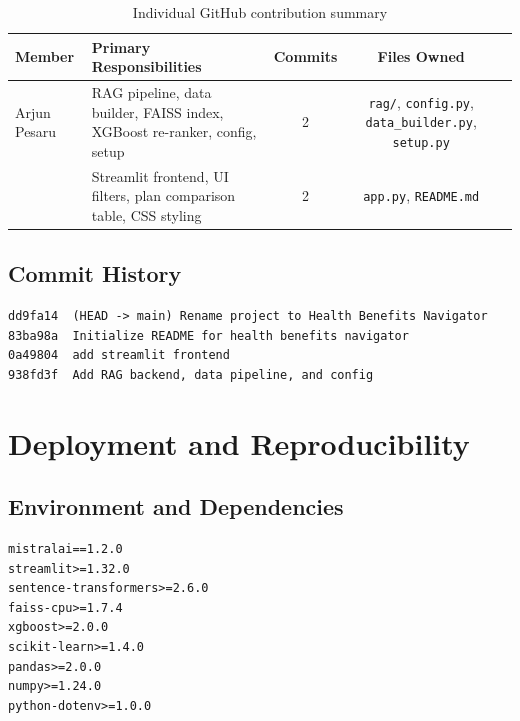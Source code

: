 \documentclass[12pt, letterpaper]{article}
\begin{document}
\begin{table}[H]
  \centering
  \caption{Individual GitHub contribution summary}
  \label{tab:git_contributions}
  \begin{tabularx}{\linewidth}{lXccc}
    \toprule
    \textbf{Member} & \textbf{Primary Responsibilities} & \textbf{Commits} & \textbf{Files Owned} \\
    \midrule
    Arjun Pesaru     & RAG pipeline, data builder, FAISS index, XGBoost re-ranker, config, setup & 2 & \texttt{rag/}, \texttt{config.py}, \texttt{data\_builder.py}, \texttt{setup.py} \\
    [Teammate Name]  & Streamlit frontend, UI filters, plan comparison table, CSS styling & 2 & \texttt{app.py}, \texttt{README.md} \\
    \bottomrule
  \end{tabularx}
\end{table}

\subsection{Commit History}

\begin{lstlisting}[style=gitlog, caption={Full commit log (git log --oneline) as of submission date}, label=lst:gitlog]
dd9fa14  (HEAD -> main) Rename project to Health Benefits Navigator
83ba98a  Initialize README for health benefits navigator
0a49804  add streamlit frontend
938fd3f  Add RAG backend, data pipeline, and config
\end{lstlisting}

\section{Deployment and Reproducibility}
\label{sec:deployment}

\subsection{Environment and Dependencies}

\begin{lstlisting}[caption={requirements.txt}, label=lst:requirements]
mistralai==1.2.0
streamlit>=1.32.0
sentence-transformers>=2.6.0
faiss-cpu>=1.7.4
xgboost>=2.0.0
scikit-learn>=1.4.0
pandas>=2.0.0
numpy>=1.24.0
python-dotenv>=1.0.0
\end{lstlisting}
\end{document}
